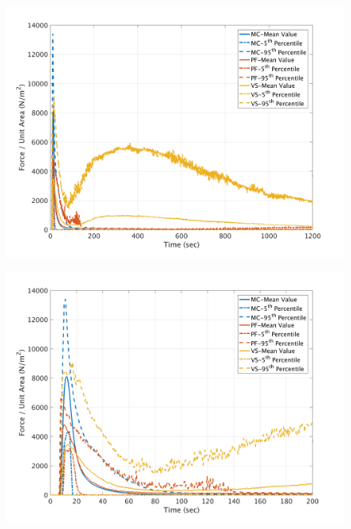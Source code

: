 \documentclass[a4paper,10pt]{article}
\begin{document}
\begin{figure}[H]
	\begin{minipage}[b]{0.5\linewidth}
	\centering
    \includegraphics[width=1\textwidth]{NetFAll/NetF2All.png}     
        \label{fig:NF2}
	\end{minipage}
	\begin{minipage}[b]{0.5\linewidth}
	\centering
    \includegraphics[width=1\textwidth]{NetFAll/NetF2All_z.png}
        \label{fig:NF2zoom}
	\end{minipage}
	

\end{figure}
\end{document}
